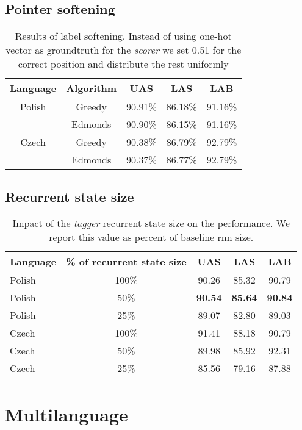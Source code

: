 \subsection{Pointer softening}
\begin{table}[!htbp]
    \centering
    \begin{tabular}{c c c c c}
        Language & Algorithm & UAS & LAS & LAB \\ \hline
        Polish & Greedy & 90.91\% & 86.18\% & 91.16\% \\
               & Edmonds & 90.90\% & 86.15\% & 91.16\% \\
        Czech  & Greedy & 90.38\% & 86.79\% & 92.79\% \\
               & Edmonds & 90.37\% & 86.77\% & 92.79\% \\
    \end{tabular}
    \caption{Results of label softening. Instead of using one-hot vector as
    groundtruth for the \textit{scorer} we set
    0.51 for the correct position and distribute the rest uniformly}
    \label{tab:soften}
\end{table}


\subsection{Recurrent state size}
\begin{table}[!htbp]
    \centering
    \begin{tabular}{l c c c c}
        Language & \% of recurrent state size & UAS & LAS & LAB \\ \hline 
        Polish & 100\% & 90.26 & 85.32 & 90.79 \\
        Polish & 50\% & \textbf{90.54} & \textbf{85.64} & \textbf{90.84} \\
        Polish & 25\% & 89.07 & 82.80 & 89.03 \\ \hline
        Czech & 100\% & 91.41 & 88.18 & 90.79 \\
        Czech & 50\% & 89.98 & 85.92 & 92.31\\
        Czech & 25\% & 85.56 & 79.16 & 87.88\\ \hline%
    \end{tabular}
    \label{tab:birnn_single_size}
    \caption{Impact of the \emph{tagger} recurrent state size on the performance.
    We report this value as percent of baseline rnn size.}
\end{table}

\section{Multilanguage}

